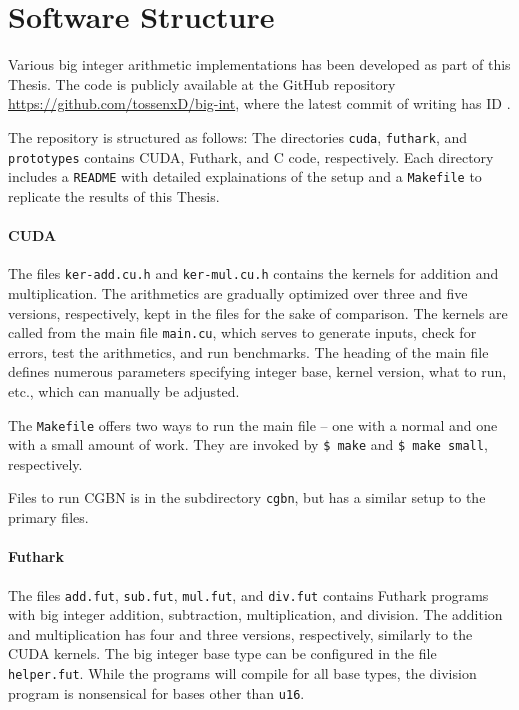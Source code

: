 \section{Software Structure}
\label{sec:cont}

Various big integer arithmetic implementations has been developed as part of
this Thesis. The code is publicly available at the GitHub repository
\url{https://github.com/tossenxD/big-int}, where the latest commit of writing
has ID {}.

The repository is structured as follows: The directories \texttt{cuda},
\texttt{futhark}, and \texttt{prototypes} contains CUDA, Futhark, and C code,
respectively. Each directory includes a \texttt{README} with detailed
explainations of the setup and a \texttt{Makefile} to replicate the results of
this Thesis.

\paragraph{CUDA}
The files \texttt{ker-add.cu.h} and \texttt{ker-mul.cu.h} contains the kernels
for addition and multiplication. The arithmetics are gradually optimized over
three and five versions, respectively, kept in the files for the sake of
comparison. The kernels are called from the main file \texttt{main.cu}, which
serves to generate inputs, check for errors, test the arithmetics, and run
benchmarks. The heading of the main file defines numerous parameters specifying
integer base, kernel version, what to run, etc., which can manually be adjusted.

The \texttt{Makefile} offers two ways to run the main file -- one with a normal
and one with a small amount of work. They are invoked by \texttt{\$ make} and
\texttt{\$ make small}, respectively.

Files to run CGBN is in the subdirectory \texttt{cgbn}, but has a similar setup
to the primary files.

\paragraph{Futhark}
The files \texttt{add.fut}, \texttt{sub.fut}, \texttt{mul.fut}, and
\texttt{div.fut} contains Futhark programs with big integer addition,
subtraction, multiplication, and division. The addition and multiplication has four
and three versions, respectively, similarly to the CUDA kernels. The big integer
base type can be configured in the file \texttt{helper.fut}. While the programs
will compile for all base types, the division program is nonsensical for bases
other than \texttt{u16}.

